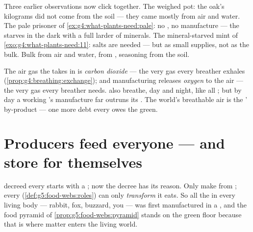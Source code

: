 \begin{example}\label{ex:g6:plants-are-producers:evidence}
Three earlier observations now click together. The weighed
pot: the oak's kilograms did not come from the soil --- they
came mostly from air and water. The pale prisoner of
\cref{ex:g4:what-plants-need:pale}: no , no
manufacture --- the  starves in the dark with a full
larder of minerals. The mineral-starved mint of
\cref{exo:g4:what-plants-need:11}: salts are needed --- but
as small supplies, not as the bulk. Bulk from air and
water,  from , seasoning from the soil.
\end{example}

\begin{remark}\label{rem:g6:plants-are-producers:gas}
The air gas the  takes in is \emph{carbon dioxide} ---
the very gas every breather exhales
(\cref{prop:g4:breathing:exchange}); and manufacturing
releases \emph{oxygen} to the air --- the very gas every
breather needs.  also breathe, day and night, like
all ; but by day a working 's manufacture
far outruns its . The world's breathable air is
the ' by-product --- one more debt every 
owes the green.
\end{remark}

\section{Producers feed everyone --- and store for themselves}

\begin{proposition}\label{prop:g6:plants-are-producers:firstlink}
 decreed every 
starts with a ; now the decree has its reason. Only
 make  from ; every
 (\cref{def:g5:food-webs:roles}) can only
\emph{transform}  it eats. So all the  in every living body --- rabbit, fox, buzzard, you
--- was first manufactured in a , and the food pyramid
of \cref{prop:g5:food-webs:pyramid} stands on the green
floor because that is where matter enters the living world.
\end{proposition}
\admitted

